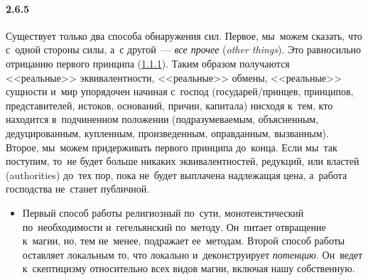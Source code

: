 \paragraph{2.6.5}\hypertarget{par:2.6.5}{} Существует только два способа обнаружения сил. Первое, мы~можем сказать, что с~одной стороны силы, а~с другой~--- {\itshape все прочее} ({\itshape other things}). Это равносильно отрицанию первого принципа (\hyperlink{par:1.1.1}{1.1.1}). Таким образом получаются <<реальные>> эквивалентности, <<реальные>> обмены, <<реальные>> сущности и~мир упорядочен начиная с~господ (государей/принцев, принципов, представителей, истоков, оснований, причин, капитала) нисходя к~тем, кто находится в~подчиненном положении (подразумеваемым, объясненным, дедуцированным, купленным, произведенным, оправданным, вызванным). Второе, мы~можем придерживать первого принципа до~конца. Если мы~так поступим, то~не будет больше никаких эквивалентностей, редукций, или властей (authorities) до~тех пор, пока не~будет выплачена надлежащая цена, а~работа господства не~станет публичной. 
	\begin{itemize}
	\item 
	Первый способ работы религиозный по~сути, монотеистический по~необходимости и~гегельянский по~методу. Он~питает отвращение к~магии, но, тем не~менее, подражает ее~методам. Второй способ работы оставляет локальным то, что локально и~деконструирует {\itshape потенцию}. Он~ведет к~скептицизму относительно всех видов магии, включая нашу собственную.
	\end{itemize}


